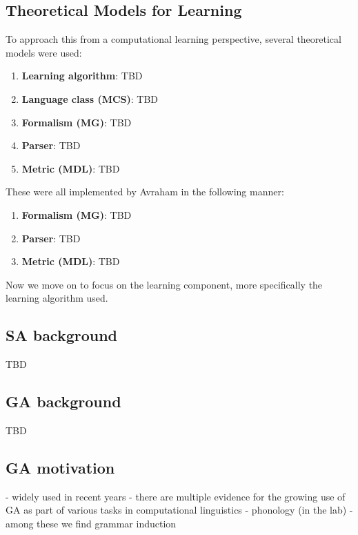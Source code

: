 \documentclass{article}
\begin{document}
\subsection{Theoretical Models for Learning} %
To approach this from a computational learning perspective, several theoretical models were used:
\begin{enumerate}
  \item \textbf{Learning algorithm}: TBD
  \item \textbf{Language class (MCS)}: TBD
  \item \textbf{Formalism (MG)}: TBD
  \item \textbf{Parser}: TBD
  \item \textbf{Metric (MDL)}: TBD
\end{enumerate}

These were all implemented by Avraham in the following manner:
\begin{enumerate}
  \item \textbf{Formalism (MG)}: TBD
  \item \textbf{Parser}: TBD
  \item \textbf{Metric (MDL)}: TBD
\end{enumerate}



Now we move on to focus on the learning component, more specifically the learning algorithm used.


\subsection{SA background} %
TBD
\subsection{GA background} %
TBD
\subsection{GA motivation} %
- widely used in recent years
- there are multiple evidence for the growing use of GA as part of various tasks in computational linguistics
- phonology (in the lab)
- among these we find grammar induction
\end{document}
